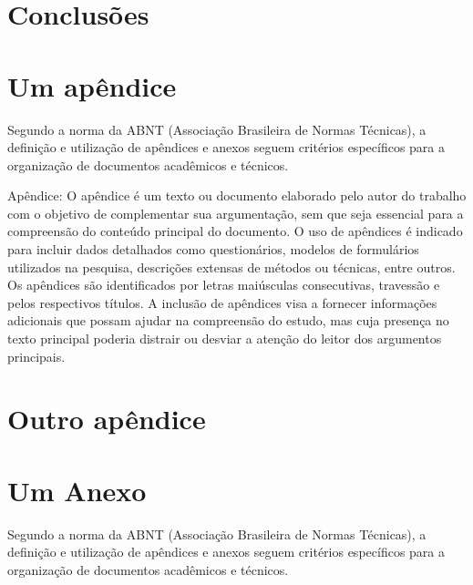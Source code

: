 \documentclass[dsc,pdfa]{coppe}
\begin{document}
  \chapter{Conclusões}

  \backmatter

  \nocite{patente-example,legislacao-example,norma-example,mapa-example,partitura-example}
  \nocite{jurisprudencia-example}
  \nocite{videogame-example,filme-example,semautor-example,semautorart-example}
  \nocite{jornalcaderno-example,jornal-example}
  \printbibliography

\appendix

\chapter{Um apêndice}

Segundo a norma da ABNT (Associação Brasileira de Normas Técnicas), a definição e utilização de apêndices e anexos seguem critérios específicos para a organização de documentos acadêmicos e técnicos.

Apêndice: O apêndice é um texto ou documento elaborado pelo autor do trabalho com o objetivo de complementar sua argumentação, sem que seja essencial para a compreensão do conteúdo principal do documento. O uso de apêndices é indicado para incluir dados detalhados como questionários, modelos de formulários utilizados na pesquisa, descrições extensas de métodos ou técnicas, entre outros. Os apêndices são identificados por letras maiúsculas consecutivas, travessão e pelos respectivos títulos. A inclusão de apêndices visa a fornecer informações adicionais que possam ajudar na compreensão do estudo, mas cuja presença no texto principal poderia distrair ou desviar a atenção do leitor dos argumentos principais.

\chapter{Outro apêndice}

\annex

\chapter{Um Anexo}
Segundo a norma da ABNT (Associação Brasileira de Normas Técnicas), a definição e utilização de apêndices e anexos seguem critérios específicos para a organização de documentos acadêmicos e técnicos.
\end{document}
